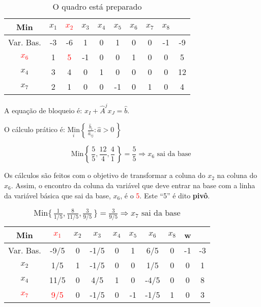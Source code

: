 \begin{table}[!h]
\centering
\caption{O quadro está preparado}
\begin{tabular}{|c|cccccccc|c|}
  \hline
  Min                    & $x_1$ & \textcolor{red}{$x_2$} & $x_3$ & $x_4$ & $x_5$ & $x_6$ & $x_7$ & $x_8$ &     \\
  \hline
  Var. Bas.              &   -3  &   -6                   &   1   &   0   &   1   &   0   &   0   &  -1   &  -9 \\
  \hline
  \textcolor{red}{$x_6$} &   1   &   \textcolor{red}{5}   &  -1   &   0   &   0   &   1   &   0   &   0   &   5 \\
  $x_4$                  &   3   &   4                    &   0   &   1   &   0   &   0   &   0   &   0   &  12 \\
  $x_7$                  &   2   &   1                    &   0   &   0   &  -1   &   0   &   1   &   0   &   4 \\
  \hline
\end{tabular}
\end{table}

A equação de bloqueio é:\;  $ x_{I} + \widehat{A}^{j}x_{J} = \widehat{b} $.

O cálculo prático é:\;  $ \underset{i}{\text{Min}} \left\{\,\frac{\widehat{b}_i}{\widehat{a}_{ij}} \colon \widehat{a} > 0\,\right\} $

\[
  \text{Min}\left\{\,\frac{5}{5}, \frac{12}{4}, \frac{4}{1}\,\right\} = \frac{5}{5} \Longrightarrow x_6 \text{ sai da base }
\]

Os cálculos são feitos com o objetivo de transformar a coluna do $ x_2 $ na 
coluna do $ x_6 $.
Assim, o encontro da coluna da variável que deve entrar na base com a linha da
variável básica que sai da base, $ x_6 $, é o \textcolor{red}{5}.
Este ``5'' é dito \textbf{pivô}.
 
\begin{table}[!h]
\centering
\caption{$\text{Min}\{\,\frac{1}{1/5}, \frac{8}{11/5}, \frac{3}{9/5}\,\} = \frac{3}{9/5} \Rightarrow x_7 \text{ sai da base}$}
\begin{tabular}{|c|cccccccc|c|}
  \hline
  Min                    & \textcolor{red}{$x_1$}   & $x_2$ & $x_3$ & $x_4$ & $x_5$ & $x_6$ & $x_8$ &  w  &    \\
  \hline
  Var. Bas.              &                    -9/5  & 0     & -1/5  & 0     & 1     & 6/5   & 0     & -1  & -3 \\
  \hline 
  $x_2$                  &                    1/5   &   1   &  -1/5 &     0 &   0   &   1/5 &   0   &   0 &  1 \\
  $x_4$                  &                   11/5   &   0   &   4/5 &     1 &   0   &  -4/5 &   0   &   0 &  8 \\
  \textcolor{red}{$x_7$} &   \textcolor{red}{9/5}   &   0   &  -1/5 &     0 &  -1   &  -1/5 &   1   &   0 &  3 \\
  \hline
\end{tabular}
\end{table} 
 
